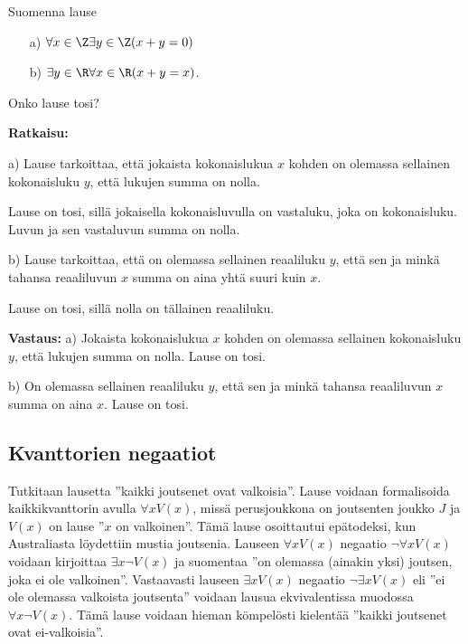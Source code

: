 \begin{esimerkki}
Suomenna lause
\begin{itemize}
\item[a)] $\forall x\in \Z\exists y\in \Z (x+y=0)$
\item[b)] $\exists y\in \R\forall x\in \R (x+y =x)$.
\end{itemize}
Onko lause tosi?

{\bf Ratkaisu:}

a) Lause tarkoittaa, että jokaista kokonaislukua $x$ kohden on
olemassa sellainen kokonaisluku $y$, että lukujen summa on nolla.

Lause on tosi, sillä jokaisella kokonaisluvulla on vastaluku,
joka on kokonaisluku. Luvun ja sen vastaluvun summa on nolla.

b) Lause tarkoittaa, että on olemassa sellainen reaaliluku $y$,
että sen ja minkä tahansa reaaliluvun $x$ summa on aina yhtä
suuri kuin $x$.

Lause on tosi, sillä nolla on tällainen reaaliluku.

{\bf Vastaus:} a) Jokaista kokonaislukua $x$ kohden on olemassa
sellainen kokonaisluku $y$, että lukujen summa on nolla. Lause on
tosi.

b) On olemassa sellainen reaaliluku $y$, että sen ja minkä
tahansa reaaliluvun $x$ summa on aina $x$. Lause on tosi.
\end{esimerkki}

\subsection*{Kvanttorien negaatiot} Tutkitaan lausetta ''kaikki joutsenet ovat valkoisia''. Lause voidaan formalisoida kaikkikvanttorin avulla $\forall x V(x)$, missä perusjoukkona on joutsenten joukko $J$ ja $V(x)$ on lause ''$x$ on valkoinen''. Tämä lause osoittautui epätodeksi, kun Australiasta löydettiin mustia joutsenia. Lauseen $\forall x V(x)$ negaatio $\lnot \forall x V(x)$ voidaan kirjoittaa $\exists x \lnot V(x)$ ja suomentaa ''on olemassa (ainakin yksi) joutsen, joka ei ole valkoinen''. Vastaavasti lauseen $\exists x V(x)$ negaatio $\lnot \exists x V(x)$ eli ''ei ole olemassa valkoista joutsenta'' voidaan lausua ekvivalentissa muodossa $\forall x \lnot V(x)$. Tämä lause voidaan hieman kömpelösti kielentää ''kaikki joutsenet ovat ei-valkoisia''.



